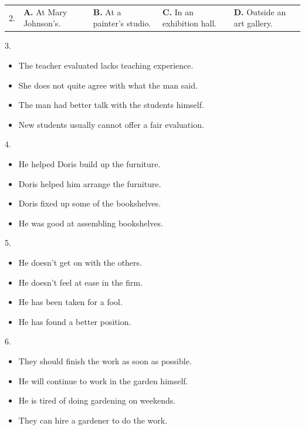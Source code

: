 \documentclass[UTF8,11pt]{ctexart}
\begin{document}
\noindent\begin{tabularx}{\linewidth}{@{}lXXXX@{}}2. & \textbf{A.} At Mary Johnson’s. & \textbf{B.} At a painter’s studio. & \textbf{C.} In an exhibition hall. & \textbf{D.} Outside an art gallery.\\\end{tabularx}\par

3.


\begin{itemize}[leftmargin=2em,itemsep=.2em,topsep=.4em]\item[A.] The teacher evaluated lacks teaching experience.
\item[B.] She does not quite agree with what the man said.
\item[C.] The man had better talk with the students himself.
\item[D.] New students usually cannot offer a fair evaluation.
\end{itemize}

4.


\begin{itemize}[leftmargin=2em,itemsep=.2em,topsep=.4em]\item[A.] He helped Doris build up the furniture.
\item[B.] Doris helped him arrange the furniture.
\item[C.] Doris fixed up some of the bookshelves.
\item[D.] He was good at assembling bookshelves.
\end{itemize}

5.


\begin{itemize}[leftmargin=2em,itemsep=.2em,topsep=.4em]\item[A.] He doesn’t get on with the others.
\item[B.] He doesn’t feel at ease in the firm.
\item[C.] He has been taken for a fool.
\item[D.] He has found a better position.
\end{itemize}

6.


\begin{itemize}[leftmargin=2em,itemsep=.2em,topsep=.4em]\item[A.] They should finish the work as soon as possible.
\item[B.] He will continue to work in the garden himself.
\item[C.] He is tired of doing gardening on weekends.
\item[D.] They can hire a gardener to do the work.
\end{itemize}
\end{document}
